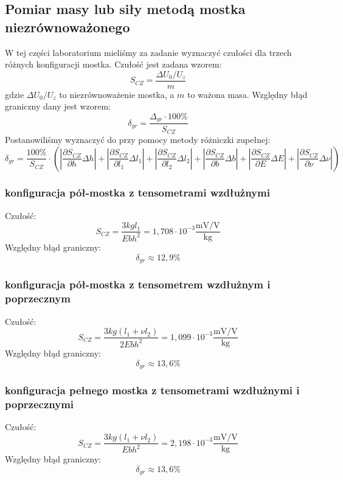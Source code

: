 \documentclass[a4paper, 12pt, titlepage]{article}
\begin{document}
		\subsection{Pomiar masy lub siły metodą mostka niezrównoważonego}
			W tej części laboratorium mieliśmy za zadanie wyznaczyć czułości dla trzech różnych konfiguracji mostka. Czułość jest zadana wzorem:
			$$
				S_{CZ} = \frac{\Delta U_0 / U_z}{m}
			$$
			gdzie $\Delta U_0 / U_z$ to niezrównoważenie mostka, a $m$ to ważona masa. Względny błąd graniczny dany jest wzorem:
			$$
				\delta_{gr} = \frac{\Delta_{gr} \cdot 100\%}{S_{CZ}} 
			$$
			Postanowiliśmy wyznaczyć do przy pomocy metody różniczki zupełnej:
			$$
				\delta_{gr}= \frac{100\%}{S_{CZ}} 
				\cdot 
				\left(
					\left|\frac{\partial S_{CZ}}{\partial h} \Delta h\right|
					+
					\left|\frac{\partial S_{CZ}}{\partial l_1} \Delta l_1\right|
					+
					\left|\frac{\partial S_{CZ}}{\partial l_2} \Delta l_2\right|
					+
					\left|\frac{\partial S_{CZ}}{\partial b} \Delta b\right|
					+
					\left|\frac{\partial S_{CZ}}{\partial E} \Delta E\right|
					+
					\left|\frac{\partial S_{CZ}}{\partial \nu} \Delta \nu\right|
				\right)
			$$
			\subsubsection{konfiguracja pół-mostka z tensometrami wzdłużnymi}
				Czułość:
				$$
					S_{CZ} = \frac{3kgl_1}{Ebh^2} = 1,708 \cdot 10^{-3} \mathrm{\frac{mV/V}{kg}}
				$$
				Względny błąd graniczny:
				$$
					\delta_{gr} \approx 12,9\%
				$$
			\subsubsection{konfiguracja pół-mostka z tensometrem wzdłużnym i poprzecznym}
				Czułość:
				$$
					S_{CZ} = \frac{3kg(l_1 + \nu l_2)}{2Ebh^2} = 1,099 \cdot 10^{-3} \mathrm{\frac{mV/V}{kg}}
				$$
				Względny błąd graniczny:
				$$
					\delta_{gr} \approx 13,6\%
				$$
			\subsubsection{konfiguracja pełnego mostka z tensometrami wzdłużnymi i poprzecznymi}
				Czułość:
				$$
					S_{CZ} = \frac{3kg(l_1 + \nu l_2)}{Ebh^2} = 2,198 \cdot 10^{-3} \mathrm{\frac{mV/V}{kg}}
				$$
				Względny błąd graniczny:
				$$
				\delta_{gr} \approx 13,6 \%
				$$
\end{document}
